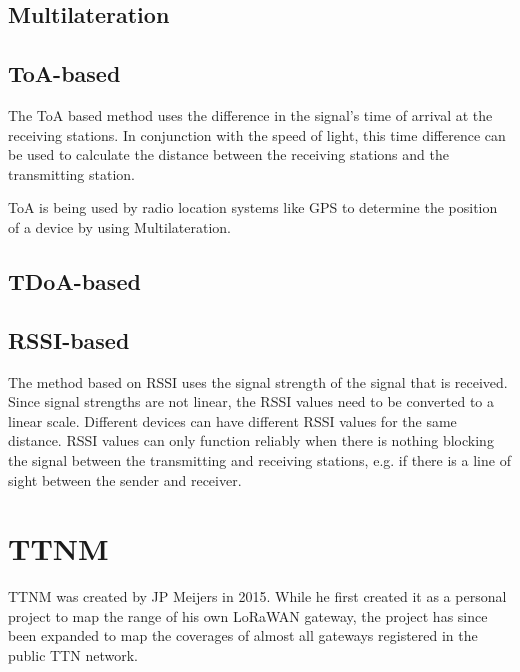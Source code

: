 \subsection{Multilateration}

\subsection{\acs{ToA}-based}

The \acf{ToA} based method uses the difference in the signal's time of arrival at the receiving stations.
In conjunction with the speed of light, this time difference can be used to calculate the distance between the receiving stations and the transmitting station.

\ac{ToA} is being used by radio location systems like \ac{GPS} to determine the position of a device by using Multilateration.

\subsection{\acs{TDoA}-based}


\subsection{\acs{RSSI}-based}

The method based on \acf{RSSI} uses the signal strength of the signal that is received.
Since signal strengths are not linear, the \ac{RSSI} values need to be converted to a linear scale.
Different devices can have different \ac{RSSI} values for the same distance.
\ac{RSSI} values can only function reliably when there is nothing blocking the signal between the transmitting and receiving stations, e.g. if there is a line of sight between the sender and receiver.

\section{\acf{TTNM}}


\acf{TTNM} was created by JP Meijers in 2015. %
While he first created it as a personal project to map the range of his own \ac{LoRaWAN} gateway, the project has since been expanded to map the coverages of almost all gateways registered in the public \ac{TTN} network.


